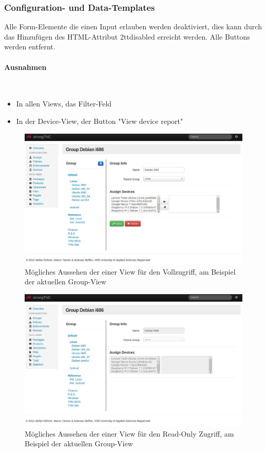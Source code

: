 \subsubsection{Configuration- und Data-Templates}

Alle Form-Elemente die einen Input erlauben werden deaktiviert, dies kann durch das 
Hinzufügen des HTML-Attribut \text2tt{disabled} erreicht werden. Alle Buttons werden entfernt.

\paragraph{Ausnahmen} \hspace{0pt} \\
\begin{itemize}
    \item In allen Views, das Filter-Feld
    \item In der Device-View, der Button "View device report"
\end{itemize}

\begin{figure}[H]
	\centering
	\includegraphics[width=\textwidth]{images/rollen-konzept/group-view-admin.jpg}
	\caption{Mögliches Aussehen der einer View für den Vollzugriff, am Beispiel der aktuellen Group-View}
\end{figure}

\begin{figure}[H]
	\centering
	\includegraphics[width=\textwidth]{images/rollen-konzept/group-view-read-only.jpg}
	\caption{Mögliches Aussehen der einer View für den Read-Only Zugriff, am Beispiel der aktuellen Group-View}
\end{figure}


